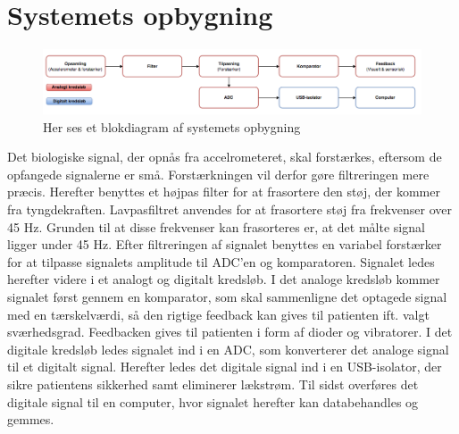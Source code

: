 \section{Systemets opbygning}
\begin{figure}[H]
	\centering
	\includegraphics[scale=0.5]{figures/Blokdiagram.jpg}
	\caption{Her ses et blokdiagram af systemets opbygning}
	\label{Blokdiagram}
\end{figure}

Det biologiske signal, der opnås fra accelrometeret, skal forstærkes, eftersom de opfangede signalerne er små. Forstærkningen vil derfor gøre filtreringen mere præcis. Herefter benyttes et højpas filter for at frasortere den støj, der kommer fra tyngdekraften. Lavpasfiltret anvendes for at frasortere støj fra frekvenser over 45 Hz. Grunden til at disse frekvenser kan frasorteres er, at det målte signal ligger under 45 Hz. Efter filtreringen af signalet benyttes en variabel forstærker for at tilpasse signalets amplitude til ADC’en og komparatoren. Signalet ledes herefter videre i et analogt og digitalt kredsløb. I det analoge kredsløb kommer signalet først gennem en komparator, som skal sammenligne det optagede signal med en tærskelværdi, så den rigtige feedback kan gives til patienten ift. valgt sværhedsgrad. Feedbacken gives til patienten i form af dioder og vibratorer. I det digitale kredsløb ledes signalet ind i en ADC, som konverterer det analoge signal til et digitalt signal. Herefter ledes det digitale signal ind i en USB-isolator, der sikre patientens sikkerhed samt eliminerer lækstrøm. Til sidst overføres det digitale signal til en computer, hvor signalet herefter kan databehandles og gemmes.